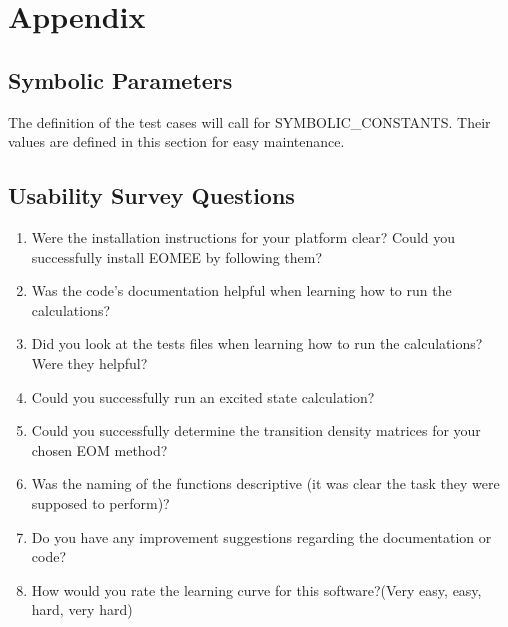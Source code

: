 \documentclass[12pt, titlepage]{article}
\begin{document}
				




\newpage

\section{Appendix}
\label{section:appendix}


\subsection{Symbolic Parameters}

The definition of the test cases will call for SYMBOLIC\_CONSTANTS.
Their values are defined in this section for easy maintenance.

\subsection{Usability Survey Questions}

\begin{enumerate}
	\item Were the installation instructions for your platform clear? Could you 
	successfully install EOMEE by following them?
	\item Was the code's documentation helpful when learning how to run the 
	calculations?
	\item Did you look at the tests files when learning how to run the 
	calculations? Were they helpful?
	\item Could you successfully run an excited state calculation?
	\item Could you successfully determine the transition density matrices for 
	your chosen EOM method?
	\item Was the naming of the functions descriptive (it was clear the 
	task they were supposed to perform)?
	\item Do you have any improvement suggestions regarding the documentation 
	or code?
	\item How would you rate the learning curve for this software?(Very easy, 
	easy, hard, very hard)
\end{enumerate}
\end{document}
